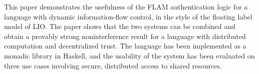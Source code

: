 This paper demonstrates the usefulness of the FLAM authentication logic for a language with dynamic information-flow control, in the style of the floating label model of LIO. The paper shows that the two systems can be combined and obtain a provably strong noninterference result for a language with distributed computation and decentralized trust. The language has been implemented as a monadic library in Haskell, and the usability of the system has been evaluated on three use cases involving secure, distributed access to shared resources.
